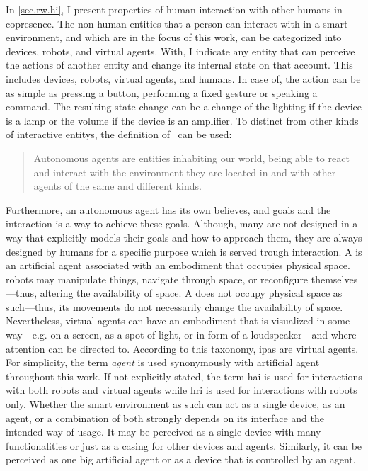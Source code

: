 In \cref{sec.rw.hi}, I present properties of human interaction with other humans in \gls{copresence}.
The non-human entities that a person can interact with in a \gls{smart environment}, and which are in the focus of this work, can be categorized into \glspl{device}, \glspl{robot}, and \glspl{virtual agent}.
With, I indicate any entity that can perceive the actions of another entity and change its internal state on that account.
This includes \glspl{device}, \glspl{robot}, \glspl{virtual agent}, and humans.
In case of, the action can be as simple as pressing a button, performing a fixed gesture or speaking a command.
The resulting state change can be a change of the lighting if the \gls{device} is a lamp or the volume if the \gls{device} is an amplifier.
To distinct from other kinds of \glspl{interactive entity}, the definition of~ can be used:
\blockcquote[]{Dautenhahn1998}{Autonomous agents are entities inhabiting our world, being able to react and interact with the environment they are located in and with other agents of the same and different kinds.}.
Furthermore, an \gls{autonomous agent} has its own believes, and goals and the interaction is a way to achieve these goals.
Although, many are not designed in a way that explicitly models their goals and how to approach them, they are always designed by humans for a specific purpose which is served trough interaction.
A is an \gls{artificial agent} associated with an embodiment that occupies physical space.
\Glspl{robot} may manipulate things, navigate through space, or reconfigure themselves---thus, altering the availability of space.
A does not occupy physical space as such---thus, its movements do not necessarily change the availability of space.
Nevertheless, \glspl{virtual agent} can have an embodiment that is visualized in some way---e.g. on a screen, as a spot of light, or in form of a loudspeaker---and where attention can be directed to.
According to this taxonomy, \glspl{ipa} are \glspl{virtual agent}.
For simplicity, the term \emph{agent} is used synonymously with \gls{artificial agent} throughout this work.
If not explicitly stated, the term \acrfull{hai} is used for interactions with both \glspl{robot} and \glspl{virtual agent} while \acrfull{hri} is used for interactions with \glspl{robot} only.
Whether the \gls{smart environment} as such can act as a single \gls{device}, as an agent, or a combination of both strongly depends on its interface and the intended way of usage.
It may be perceived as a single \gls{device} with many functionalities or just as a casing for other \glspl{device} and agents.
Similarly, it can be perceived as one big \gls{artificial agent} or as a \gls{device} that is controlled by an agent.

